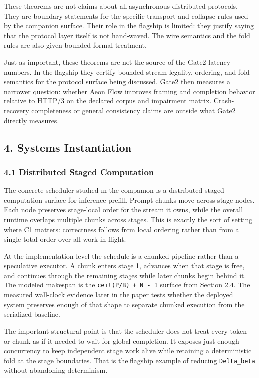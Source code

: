 \documentclass[
  11pt,
]{article}
\begin{document}
These theorems are not claims about all asynchronous distributed
protocols. They are boundary statements for the specific transport and
collapse rules used by the companion surface. Their role in the flagship
is limited: they justify saying that the protocol layer itself is not
hand-waved. The wire semantics and the fold rules are also given bounded
formal treatment.

Just as important, these theorems are not the source of the Gate2
latency numbers. In the flagship they certify bounded stream legality,
ordering, and fold semantics for the protocol surface being discussed.
Gate2 then measures a narrower question: whether Aeon Flow improves
framing and completion behavior relative to HTTP/3 on the declared
corpus and impairment matrix. Crash-recovery completeness or general
consistency claims are outside what Gate2 directly measures.

\subsection{4. Systems Instantiation}\label{systems-instantiation}

\subsubsection{4.1 Distributed Staged
Computation}\label{distributed-staged-computation}

The concrete scheduler studied in the companion is a distributed staged
computation surface for inference prefill. Prompt chunks move across
stage nodes. Each node preserves stage-local order for the stream it
owns, while the overall runtime overlaps multiple chunks across stages.
This is exactly the sort of setting where C1 matters: correctness
follows from local ordering rather than from a single total order over
all work in flight.

At the implementation level the schedule is a chunked pipeline rather
than a speculative executor. A chunk enters stage 1, advances when that
stage is free, and continues through the remaining stages while later
chunks begin behind it. The modeled makespan is the
\texttt{ceil(P/B)\ +\ N\ -\ 1} surface from Section 2.4. The measured
wall-clock evidence later in the paper tests whether the deployed system
preserves enough of that shape to separate chunked execution from the
serialized baseline.

The important structural point is that the scheduler does not treat
every token or chunk as if it needed to wait for global completion. It
exposes just enough concurrency to keep independent stage work alive
while retaining a deterministic fold at the stage boundaries. That is
the flagship example of reducing \texttt{Delta\_beta} without abandoning
determinism.
\end{document}
